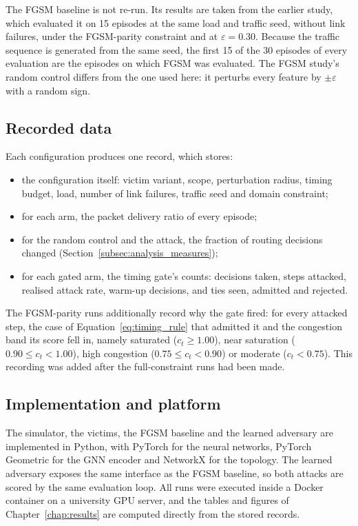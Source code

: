 The FGSM baseline is not re-run. Its results are taken from the earlier study, which
evaluated it on 15 episodes at the same load and traffic seed, without link failures,
under the FGSM-parity constraint and at $\varepsilon = 0.30$. Because the traffic
sequence is generated from the same seed, the first 15 of the 30 episodes of every
evaluation are the episodes on which FGSM was evaluated. The FGSM study's random control
differs from the one used here: it perturbs every feature by $\pm\varepsilon$ with a
random sign.

\subsection{Recorded data}
\label{subsec:procedure_records}

Each configuration produces one record, which stores:
\begin{itemize}
  \item the configuration itself: victim variant, scope, perturbation radius, timing
        budget, load, number of link failures, traffic seed and domain constraint;
  \item for each arm, the packet delivery ratio of every episode;
  \item for the random control and the attack, the fraction of routing decisions changed
        (Section~\ref{subsec:analysis_measures});
  \item for each gated arm, the timing gate's counts: decisions taken, steps attacked,
        realised attack rate, warm-up decisions, and ties seen, admitted and rejected.
\end{itemize}
The FGSM-parity runs additionally record why the gate fired: for every attacked step,
the case of Equation~\eqref{eq:timing_rule} that admitted it and the congestion band its
score fell in, namely saturated ($c_t \ge 1.00$), near saturation
($0.90 \le c_t < 1.00$), high congestion ($0.75 \le c_t < 0.90$) or moderate
($c_t < 0.75$). This recording was added after the full-constraint runs had been made.

\subsection{Implementation and platform}
\label{subsec:procedure_platform}

The simulator, the victims, the FGSM baseline and the learned adversary are implemented
in Python, with PyTorch for the neural networks, PyTorch Geometric for the GNN encoder
and NetworkX for the topology. The learned adversary exposes the same interface as the
FGSM baseline, so both attacks are scored by the same evaluation loop. All runs were
executed inside a Docker container on a university GPU server, and the tables and
figures of Chapter~\ref{chap:results} are computed directly from the stored records.

